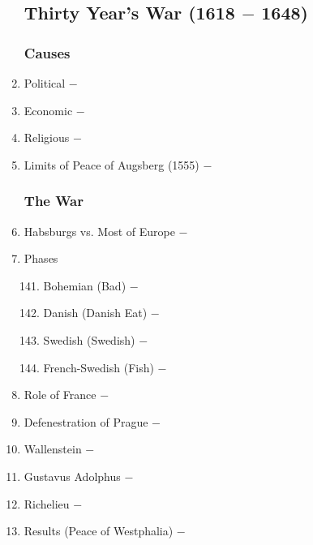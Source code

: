 \documentclass[12pt]{article}
\begin{document}
\begin{enumerate}
\subsection{Thirty Year's War (1618 $-$ 1648)}

\subsubsection{Causes}

\item Political $-$ 

\item Economic $-$ 

\item Religious $-$ 

\item Limits of Peace of Augsberg (1555) $-$

\subsubsection{The War}

\item Habsburgs vs. Most of Europe $-$

\item Phases

\begin{enumerate}[label=\arabic{*}.]
\setcounter{enumii}{140}

\item Bohemian (Bad) $-$

\item Danish (Danish Eat) $-$ 

\item Swedish (Swedish) $-$ 

\item French-Swedish (Fish) $-$

\end{enumerate}
\setcounter{enumi}{144}
\item Role of France $-$ 

\item Defenestration of Prague $-$ 

\item Wallenstein $-$ 

\item Gustavus Adolphus $-$ 

\item Richelieu $-$ 

\item Results (Peace of Westphalia) $-$  


\end{enumerate}
\end{document}
